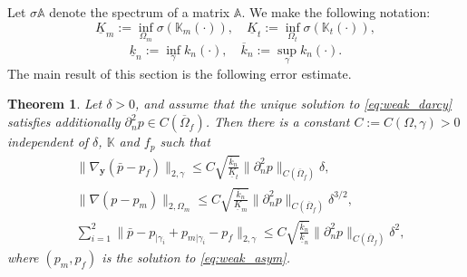 \documentclass[a4paper]{article}
\newtheorem{theorem}{Theorem}
\def\vc#1{\mathbf{\boldsymbol{#1}}}     %
\def\tn#1{{\mathbb{#1}}}    %
\def\norm#1{\|#1\|}
\def\yy{{\vc y}}
\begin{document}
Let $\sigma\tn A$ denote the spectrum of a matrix $\tn A$.
We make the following notation:
\[ \underline K_m := \inf_{\Omega_m}\sigma(\tn K_m(\cdot)), \quad \underline K_t := \inf_{\Omega_t}\sigma(\tn K_t(\cdot)), \]
\[ \underline k_n := \inf_{\gamma}k_n(\cdot), \quad \overline k_n:=\sup_{\gamma}k_n(\cdot). \]
The main result of this section is the following error estimate.
\begin{theorem}
\label{th:error_estimate}
Let $\delta>0$, and assume that the unique solution to \eqref{eq:weak_darcy} satisfies additionally $\partial_n^2 p\in C(\overline\Omega_f)$.
Then there is a constant $C:=C(\Omega,\gamma)>0$ independent of $\delta$, $\tn K$ and $f_p$ such that
\begin{subequations}
\label{eq:error_estimates_delta}
\begin{align}
&\norm{\nabla_\yy(\bar p- p_f)}_{2,\gamma} \le C\sqrt{\frac{\overline k_n}{\underline K_t}}\norm{\partial_n^2 p}_{C(\overline\Omega_f)}\delta,\\
&\norm{\nabla(p-p_m)}_{2,\Omega_m} \le C\sqrt{\frac{\overline k_n}{\underline K_m}}\norm{\partial_n^2 p}_{C(\overline\Omega_f)}\delta^{3/2},\\
&\sum_{i=1}^2\norm{\bar p-p_{|\gamma_i}+p_{m|\gamma_i}-p_f}_{2,\gamma} \le C\sqrt{\frac{\overline k_n}{\underline k_n}}\norm{\partial_n^2 p}_{C(\overline\Omega_f)}\delta^2,
\end{align}
\end{subequations}
where $(p_m,p_f)$ is the solution to \eqref{eq:weak_asym}.
\end{theorem}
\end{document}
